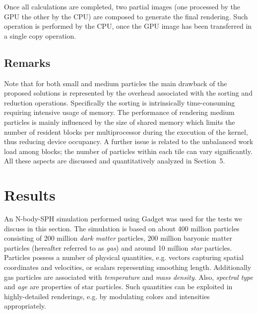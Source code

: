 \documentclass[1p]{elsarticle}
\begin{document}
Once all calculations are completed, two partial images (one processed by the GPU the other by the CPU) are composed to generate the final rendering. Such operation is performed by the CPU, once the GPU image has been transferred in a single copy operation. 

\subsection{Remarks}
Note that for both small and medium particles the main drawback of the proposed solutions
is represented by the overhead associated with the sorting and reduction operations. Specifically the sorting is intrinsically time-consuming requiring intensive usage of memory.
The performance of rendering medium particles is mainly influenced
by the size of shared memory which limits the number of resident blocks
per multiprocessor during the execution of the kernel, thus reducing device occupancy. 
A further issue is related to the unbalanced work load among blocks; the number of particles within each tile can vary significantly. All these aspects are discussed and quantitatively analyzed in Section~5.

\section{Results}
\label{sec:results}


An N-body-SPH simulation performed using Gadget \cite{gadgeturl} was used for the tests we discuss in this section. The simulation is based on about 400 million particles consisting of 200 million {\it dark matter} particles, 200 million baryonic matter particles (hereafter referred to as {\it gas}) and around 10 million {\it star} particles. Particles possess a number of physical quantities, e.g. vectors capturing spatial coordinates and velocities, or scalars representing smoothing length. Additionally gas particles are associated with {\it temperature} and {\it mass density}. Also, {\it spectral type} and {\it age} are properties of star particles. Such quantities can be exploited in highly-detailed renderings, e.g. by modulating colors and intensities appropriately. 
\end{document}
